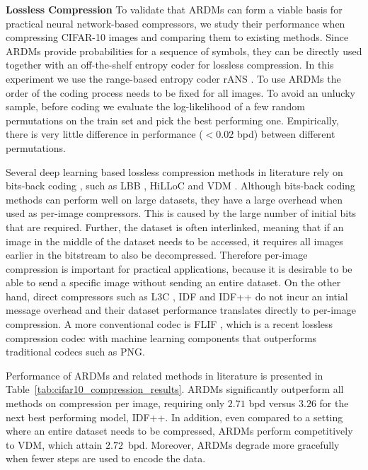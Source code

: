 \documentclass{article} \usepackage{iclr2022_conference,times}
\begin{document}
\textbf{Lossless Compression} \hspace{.2cm}
To validate that ARDMs can form a viable basis for practical neural network-based compressors, we study their performance when compressing CIFAR-10 images and comparing them to existing methods. Since ARDMs provide probabilities for a sequence of symbols, they can be directly used together with an off-the-shelf entropy coder for lossless compression. In this experiment we use the range-based entropy coder rANS \citep{duda2009asymmetric}. To use ARDMs the order of the coding process needs to be fixed for all images. To avoid an unlucky sample, before coding we evaluate the log-likelihood of a few random permutations on the train set and pick the best performing one. Empirically, there is very little difference in performance ($<\!0.02$ bpd) between different permutations. 

Several deep learning based lossless compression methods in literature rely on bits-back coding \citep{townsend2019bitsback}, such as LBB \citep{ho2019localbitsback}, HiLLoC \citep{townsend2020hilloc} and VDM \citep{kingma2021vdm}. Although bits-back coding methods can perform well on large datasets, they have a large overhead when used as per-image compressors. This is caused by the large number of initial bits that are required. Further, the dataset is often interlinked, meaning that if an image in the middle of the dataset needs to be accessed, it requires all images earlier in the bitstream to also be decompressed. Therefore per-image compression is important for practical applications, because it is desirable to be able to send a specific image without sending an entire dataset. On the other hand, direct compressors such as L3C \citep{mentzer2019practicallossless}, IDF \citep{hoogeboom2019integer} and IDF++ \citep{vdberg2021idfanalyzing} do not incur an intial message overhead and their dataset performance translates directly to per-image compression. A more conventional codec is FLIF \citep{sneyers2016flif}, which is a recent lossless compression codec with machine learning components that outperforms traditional codecs such as PNG.

Performance of ARDMs and related methods in literature is presented in Table~\ref{tab:cifar10_compression_results}. ARDMs significantly outperform all methods on compression per image, requiring only $2.71$ bpd versus $3.26$ for the next best performing model, IDF++. In addition, even compared to a setting where an entire dataset needs to be compressed, ARDMs perform competitively to VDM, which attain $2.72$~bpd. Moreover, ARDMs degrade more gracefully when fewer steps are used to encode the data.
\end{document}
